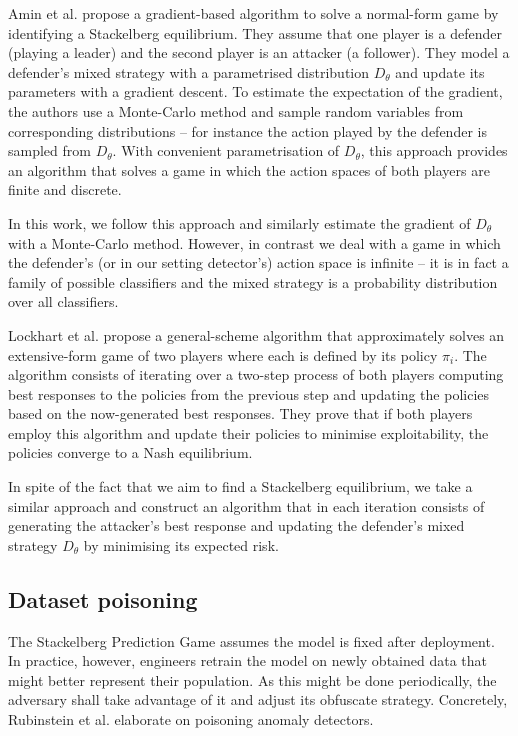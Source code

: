 Amin et al. \cite{stackgrad} propose a gradient-based algorithm to solve a normal-form game by identifying a Stackelberg equilibrium. They assume that one player is a defender (playing a leader) and the second player is an attacker (a follower). They model a defender's mixed strategy with a parametrised distribution $D_\theta$ and update its parameters with a gradient descent. To estimate the expectation of the gradient, the authors use a Monte-Carlo method and sample random variables from corresponding distributions – for instance the action played by the defender is sampled from $D_\theta$. With convenient parametrisation of $D_\theta$, this approach provides an algorithm that solves a game in which the action spaces of both players are finite and discrete.

In this work, we follow this approach and similarly estimate the gradient of $D_\theta$ with a Monte-Carlo method. However, in contrast we deal with a game in which the defender's (or in our setting detector's) action space is infinite – it is in fact a family of possible classifiers and the mixed strategy is a probability distribution over all classifiers.

Lockhart et al. \cite{exploitability_descent} propose a general-scheme algorithm that approximately solves an extensive-form game of two players where each is defined by its policy $\pi_i$. The algorithm consists of iterating over a two-step process of both players computing best responses to the policies from the previous step and updating the policies based on the now-generated best responses. They prove that if both players employ this algorithm and update their policies to minimise exploitability, the policies converge to a Nash equilibrium.

In spite of the fact that we aim to find a Stackelberg equilibrium, we take a similar approach and construct an algorithm that in each iteration consists of generating the attacker's best response and updating the defender's mixed strategy $D_\theta$ by minimising its expected risk.

\subsection{Dataset poisoning}

The Stackelberg Prediction Game assumes the model is fixed after
deployment. In practice, however, engineers retrain the model on newly
obtained data that might better represent their population. As this
might be done periodically, the adversary shall take advantage of it and
adjust its obfuscate strategy. Concretely, Rubinstein et al. \cite{antidote}
elaborate on
poisoning anomaly detectors.

